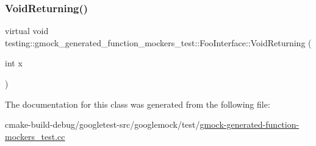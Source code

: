 \mbox{\label{classtesting_1_1gmock__generated__function__mockers__test_1_1FooInterface_adf968115cf1260004d8abe372dc71c85}} 
\subsubsection{\texorpdfstring{VoidReturning()}{VoidReturning()}}
{\footnotesize\ttfamily virtual void testing\+::gmock\+\_\+generated\+\_\+function\+\_\+mockers\+\_\+test\+::\+Foo\+Interface\+::\+Void\+Returning (\begin{DoxyParamCaption}\item[{int}]{x }\end{DoxyParamCaption})\hspace{0.3cm}{\ttfamily [pure virtual]}}



The documentation for this class was generated from the following file\+:\begin{DoxyCompactItemize}
\item 
cmake-\/build-\/debug/googletest-\/src/googlemock/test/\mbox{\hyperlink{gmock-generated-function-mockers__test_8cc}{gmock-\/generated-\/function-\/mockers\+\_\+test.\+cc}}\end{DoxyCompactItemize}
